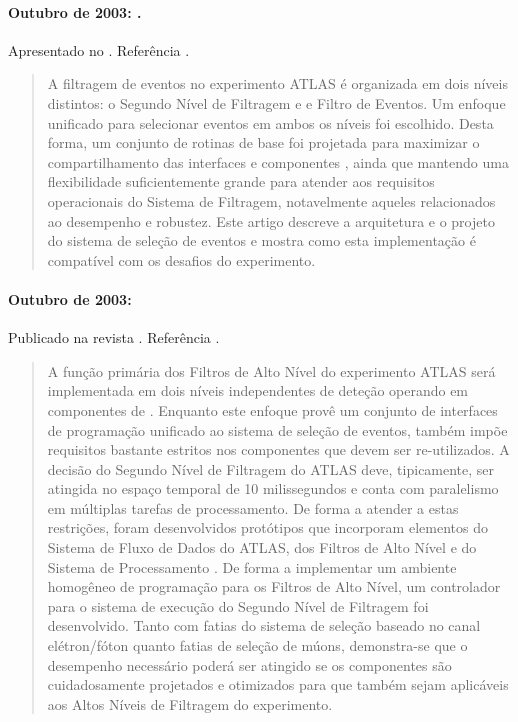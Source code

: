 \paragraph{Outubro de 2003: .} Apresentado no . Referência \cite{aa:como-2003}.

\begin{quotation}
A filtragem de eventos no experimento ATLAS é organizada em dois níveis
distintos: o Segundo Nível de Filtragem e e Filtro de Eventos. Um enfoque
unificado para selecionar eventos em ambos os níveis foi escolhido. Desta
forma, um conjunto de rotinas de base foi projetada para maximizar o
compartilhamento das interfaces e componentes , ainda que
mantendo uma flexibilidade suficientemente grande para atender aos requisitos
operacionais do Sistema de Filtragem, notavelmente aqueles relacionados ao
desempenho e robustez. Este artigo descreve a arquitetura e o projeto do
sistema de seleção de eventos e mostra como esta implementação é compatível
com os desafios do experimento.
\end{quotation}

\paragraph{Outubro de 2003: } Publicado na revista . Referência \cite{aa:tns-2004-2}.

\begin{quotation}
A função primária dos Filtros de Alto Nível do experimento ATLAS será
implementada em dois níveis independentes de deteção operando em componentes
de .  Enquanto este enfoque provê um conjunto de interfaces de
programação unificado ao sistema de seleção de eventos, também impõe
requisitos bastante estritos nos componentes  que devem ser
re-utilizados. A decisão do Segundo Nível de Filtragem do ATLAS deve,
tipicamente, ser atingida no espaço temporal de 10 milissegundos e conta com
paralelismo em múltiplas tarefas de processamento. De forma a atender a estas
restrições, foram desenvolvidos protótipos que incorporam elementos do Sistema
de Fluxo de Dados do ATLAS, dos Filtros de Alto Nível e do Sistema de
Processamento . De forma a implementar um ambiente homogêneo de
programação para os Filtros de Alto Nível, um controlador para o sistema de
execução do Segundo Nível de Filtragem foi desenvolvido. Tanto com fatias do
sistema de seleção baseado no canal elétron/fóton quanto fatias de seleção de
múons, demonstra-se que o desempenho necessário poderá ser atingido se os
componentes  são cuidadosamente projetados e otimizados para que
também sejam aplicáveis aos Altos Níveis de Filtragem do experimento.
\end{quotation}

